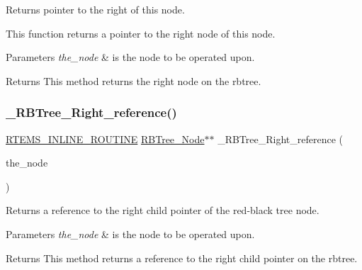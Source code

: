 Returns pointer to the right of this node. 

This function returns a pointer to the right node of this node.


\begin{DoxyParams}{Parameters}
{\em the\+\_\+node} & is the node to be operated upon.\\
\hline
\end{DoxyParams}
\begin{DoxyReturn}{Returns}
This method returns the right node on the rbtree. 
\end{DoxyReturn}
\mbox{\label{group__RTEMSScoreRBTree_gaf093b342c362e8e20ba3ddb98f21e44b}} 
\subsubsection{\texorpdfstring{\_RBTree\_Right\_reference()}{\_RBTree\_Right\_reference()}}
{\footnotesize\ttfamily \mbox{\hyperlink{group__RTEMSScoreBaseDefs_gac216239df231d5dbd15e3520b0b9313f}{R\+T\+E\+M\+S\+\_\+\+I\+N\+L\+I\+N\+E\+\_\+\+R\+O\+U\+T\+I\+NE}} \mbox{\hyperlink{structRBTree__Node}{R\+B\+Tree\+\_\+\+Node}}$\ast$$\ast$ \+\_\+\+R\+B\+Tree\+\_\+\+Right\+\_\+reference (\begin{DoxyParamCaption}\item[{\mbox{\hyperlink{structRBTree__Node}{R\+B\+Tree\+\_\+\+Node}} $\ast$}]{the\+\_\+node }\end{DoxyParamCaption})}



Returns a reference to the right child pointer of the red-\/black tree node. 


\begin{DoxyParams}{Parameters}
{\em the\+\_\+node} & is the node to be operated upon.\\
\hline
\end{DoxyParams}
\begin{DoxyReturn}{Returns}
This method returns a reference to the right child pointer on the rbtree. 
\end{DoxyReturn}
\mbox{\label{group__RTEMSScoreRBTree_ga29242f056330aaabc12dcfcaa6f10a05}} 
